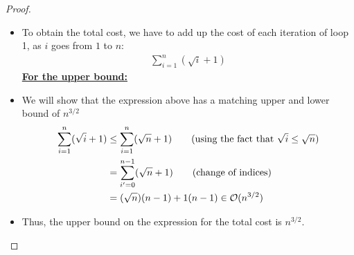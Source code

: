 \documentclass[12pt]{article}
\theoremstyle{definition}
\begin{document}
\begin{enumerate}[(a)]
\begin{proof}
\begin{itemize}
                 \item To obtain the total cost, we have to add up the cost of each iteration of loop 1, as $i$ goes from $1$ to $n$:
                 \begin{align*}
                     \sum_{i=1}^{n}(\sqrt{i} + 1)
                 \end{align*}
                 \textbf{\underline{For the upper bound:}}
                 \item We will show that the expression above has a matching upper and lower bound of $n^{3/2}$ \\
                 \begin{align*}
                     \sum_{i=1}^{n}(\sqrt{i} + 1) &\leq \sum_{i=1}^{n}(\sqrt{n} + 1) \tag{using the fact that $\sqrt{i} \leq \sqrt{n}$} \\ 
                     &= \sum_{i'=0}^{n-1} (\sqrt{n} + 1) \tag{change of indices} \\ 
                     &= (\sqrt{n})(n-1) + 1(n-1) \in \bigO(n^{3/2})
                 \end{align*}
                 \item Thus, the upper bound on the expression for the total cost is $n^{3/2}$.
                 

\end{itemize}
\end{proof}
\end{enumerate}
\end{document}
